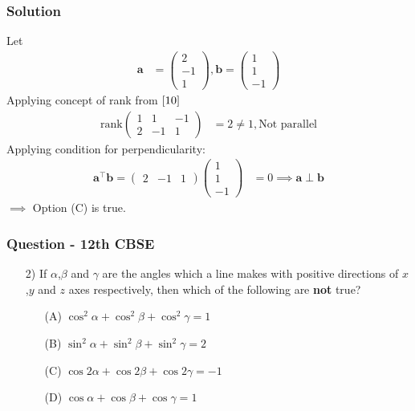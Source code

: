 \documentclass{beamer}
\begin{document}
\begin{frame}
\frametitle{Solution}
Let
\begin{align}
    \textbf{a} &= \begin{pmatrix}
        2\\
        -1\\
        1
    \end{pmatrix} , 
    \textbf{b}=\begin{pmatrix}
        1\\
        1\\
        -1
    \end{pmatrix}
    \end{align}
    Applying concept of rank from $\eqref{10}$
    \begin{align}
                  \text{rank}\begin{pmatrix}
        1 & 1 & -1\\
        2 & -1 & 1
    \end{pmatrix} &=2 \neq 1 ,
    \text{Not parallel}
    \end{align}
    Applying condition for perpendicularity:
    \begin{align}
            \textbf{a}^{\top}\textbf{b} = \begin{pmatrix}
        2 &-1 &1
    \end{pmatrix}\begin{pmatrix}
        1\\
        1\\
        -1
    \end{pmatrix} &= 0
    \implies \textbf{a} \perp \textbf{b}
\end{align}
$\implies$ Option (C) is true.
    
\end{frame}







\begin{frame}
\frametitle{Question - 12th CBSE}
\begin{enumerate}
    \item [2)]
If $\alpha$,$\beta$ and $\gamma$ are the angles which a line makes with positive directions of $x$,$y$ and $z$ axes respectively, then which of the following are \textbf{not} true?
    \begin{enumerate}
\item [(A)] $\cos^2{\alpha} + \cos^2{\beta} + \cos^2{\gamma} = 1$
\item [(B)] $\sin^2{\alpha} + \sin^2{\beta} + \sin^2{\gamma} = 2$
\item [(C)] $\cos{2\alpha} + \cos{2\beta} + \cos{2\gamma} =-1$
\item [(D)] $\cos{\alpha} + \cos{\beta} + \cos{\gamma} = 1$
\end{enumerate}
\end{enumerate}
\end{frame}
\end{document}
